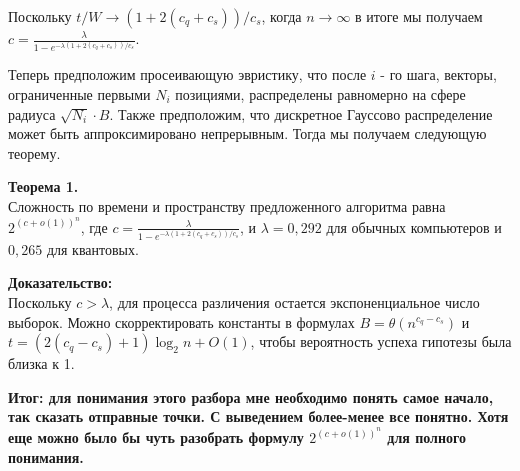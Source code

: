 \documentclass[a4paper,11pt]{article}
\begin{document}
Поскольку $t/W \rightarrow (1+2(c_q + c_s))/c_s$, когда $n \rightarrow \infty$ в итоге мы получаем $c=\frac{\lambda}{1-e^{- \lambda(1+2(c_q + c_s))/c_s}}$.

Теперь предположим просеивающую эвристику, что после $i$ - го шага, векторы, ограниченные первыми $N_i$ позициями, распределены равномерно на сфере радиуса $\sqrt{N_i}\cdot B$. Также предположим, что дискретное Гауссово распределение может быть аппроксимировано непрерывным. Тогда мы получаем следующую теорему.

\textbf{Теорема 1.}\\
Сложность по времени и пространству предложенного алгоритма равна $2^{(c+o(1))^n}$, где $c=\frac{\lambda}{1-e^{- \lambda(1+2(c_q + c_s))/c_s}}$, и $\lambda = 0,292$ для обычных компьютеров и $0,265$ для квантовых.

\textbf{Доказательство:}\\
Поскольку $c> \lambda$, для процесса различения остается экспоненциальное число выборок. Можно скорректировать константы в формулах $B=\theta(n^{c_q-c_s})$ и $t=(2(c_q-c_s)+1)\log_2 n + O(1)$, чтобы вероятность успеха гипотезы была близка к 1.

\textbf{Итог: для понимания этого разбора мне необходимо понять самое начало, так сказать отправные точки. С выведением более-менее все понятно. Хотя еще можно было бы чуть разобрать формулу $2^{(c+o(1))^n}$ для полного понимания.}\\
\end{document}
